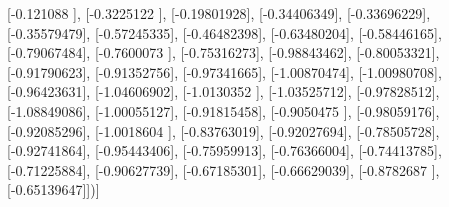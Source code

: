 \documentclass{article}
\begin{document}
       [-0.121088  ],
       [-0.3225122 ],
       [-0.19801928],
       [-0.34406349],
       [-0.33696229],
       [-0.35579479],
       [-0.57245335],
       [-0.46482398],
       [-0.63480204],
       [-0.58446165],
       [-0.79067484],
       [-0.7600073 ],
       [-0.75316273],
       [-0.98843462],
       [-0.80053321],
       [-0.91790623],
       [-0.91352756],
       [-0.97341665],
       [-1.00870474],
       [-1.00980708],
       [-0.96423631],
       [-1.04606902],
       [-1.0130352 ],
       [-1.03525712],
       [-0.97828512],
       [-1.08849086],
       [-1.00055127],
       [-0.91815458],
       [-0.9050475 ],
       [-0.98059176],
       [-0.92085296],
       [-1.0018604 ],
       [-0.83763019],
       [-0.92027694],
       [-0.78505728],
       [-0.92741864],
       [-0.95443406],
       [-0.75959913],
       [-0.76366004],
       [-0.74413785],
       [-0.71225884],
       [-0.90627739],
       [-0.67185301],
       [-0.66629039],
       [-0.8782687 ],
       [-0.65139647]])]
\end{document}
